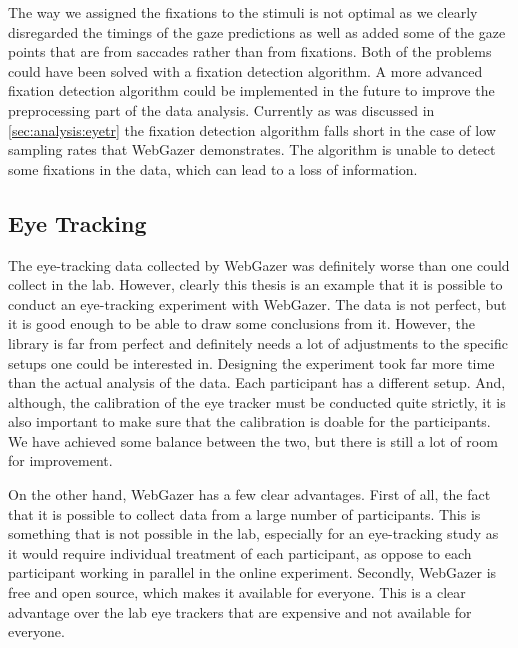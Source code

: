 The way we assigned the fixations to the stimuli is not optimal as we clearly disregarded the timings of the gaze predictions as well as added some of the gaze points that are from saccades rather than from fixations. Both of the problems could have been solved with a fixation detection algorithm. A more advanced fixation detection algorithm could be implemented in the future to improve the preprocessing part of the data analysis. Currently as was discussed in \autoref{sec:analysis:eyetr} the fixation detection algorithm falls short in the case of low sampling rates that WebGazer demonstrates. The algorithm is unable to detect some fixations in the data, which can lead to a loss of information.

\subsection{Eye Tracking}
\label{sec:general-discussion:eye-tracking}
The eye-tracking data collected by WebGazer was definitely worse than one could collect in the lab. However, clearly this thesis is an example that it is possible to conduct an eye-tracking experiment with WebGazer. The data is not perfect, but it is good enough to be able to draw some conclusions from it. However, the library is far from perfect and definitely needs a lot of adjustments to the specific setups one could be interested in. Designing the experiment took far more time than the actual analysis of the data. Each participant has a different setup. And, although, the calibration of the eye tracker must be conducted quite strictly, it is also important to make sure that the calibration is doable for the participants. We have achieved some balance between the two, but there is still a lot of room for improvement.

On the other hand, WebGazer has a few clear advantages. First of all, the fact that it is possible to collect data from a large number of participants. This is something that is not possible in the lab, especially for an eye-tracking study as it would require individual treatment of each participant, as oppose to each participant working in parallel in the online experiment. Secondly, WebGazer is free and open source, which makes it available for everyone. This is a clear advantage over the lab eye trackers that are expensive and not available for everyone. 